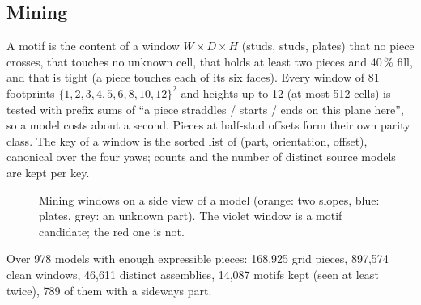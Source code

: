 \documentclass[10pt,a4paper]{article}
\begin{document}
\subsection{Mining}
A motif is the content of a window $W\times D\times H$ (studs, studs, plates) that no piece crosses, that touches no unknown cell,
that holds at least two pieces and 40\,\% fill, and that is tight (a piece touches each of its six faces). Every window of 81
footprints $\{1,2,3,4,5,6,8,10,12\}^2$ and heights up to 12 (at most 512 cells) is tested with prefix sums of ``a piece straddles /
starts / ends on this plane here'', so a model costs about a second. Pieces at half-stud offsets form their own parity class. The
key of a window is the sorted list of (part, orientation, offset), canonical over the four yaws; counts and the number of distinct
source models are kept per key.

\begin{figure}[h]
\centering
{}
\caption{Mining windows on a side view of a model (orange: two slopes, blue: plates, grey: an unknown part). The violet window is a
motif candidate; the red one is not.}
\end{figure}

Over 978 models with enough expressible pieces: 168,925 grid pieces, 897,574 clean windows, 46,611 distinct assemblies, 14,087
motifs kept (seen at least twice), 789 of them with a sideways part.
\end{document}
